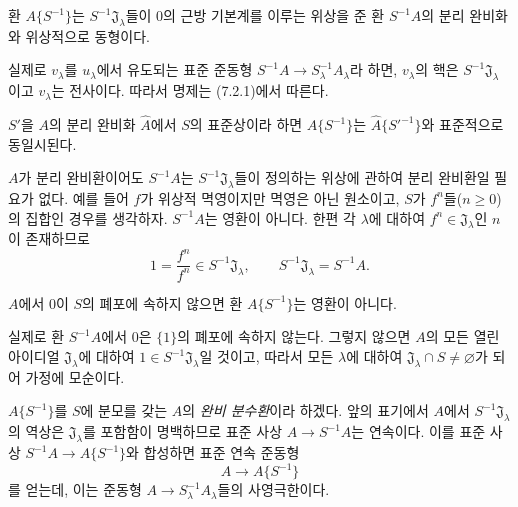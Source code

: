 \begin{proposition}[7.6.2]
\label{0.7.6.2-ko}
환 $A\{S^{-1}\}$는 $S^{-1}\mathfrak J_\lambda$들이 $0$의 근방
기본계를 이루는 위상을 준 환 $S^{-1}A$의 분리 완비화와 위상적으로
동형이다.
\end{proposition}

실제로 $v_\lambda$를 $u_\lambda$에서 유도되는 표준 준동형
$S^{-1}A\to S_\lambda^{-1}A_\lambda$라 하면, $v_\lambda$의 핵은
$S^{-1}\mathfrak J_\lambda$이고 $v_\lambda$는 전사이다. 따라서
명제는 (7.2.1)에서 따른다.

\begin{corollary}[7.6.3]
\label{0.7.6.3-ko}
$S'$을 $A$의 분리 완비화 $\widehat A$에서 $S$의 표준상이라 하면
$A\{S^{-1}\}$는 $\widehat A\{{S'}^{-1}\}$와 표준적으로
동일시된다.
\end{corollary}

$A$가 분리 완비환이어도 $S^{-1}A$는
$S^{-1}\mathfrak J_\lambda$들이 정의하는 위상에 관하여 분리
완비환일 필요가 없다. 예를 들어 $f$가 위상적 멱영이지만 멱영은 아닌
원소이고, $S$가 $f^n$들($n\geq0$)의 집합인 경우를 생각하자.
$S^{-1}A$는 영환이 아니다. 한편 각 $\lambda$에 대하여
$f^n\in\mathfrak J_\lambda$인 $n$이 존재하므로
\[
  1=\frac{f^n}{f^n}\in S^{-1}\mathfrak J_\lambda,
  \qquad S^{-1}\mathfrak J_\lambda=S^{-1}A.
\]


\begin{corollary}[7.6.4]
\label{0.7.6.4-ko}
$A$에서 $0$이 $S$의 폐포에 속하지 않으면 환 $A\{S^{-1}\}$는
영환이 아니다.
\end{corollary}

실제로 환 $S^{-1}A$에서 $0$은 $\{1\}$의 폐포에 속하지 않는다.
그렇지 않으면 $A$의 모든 열린 아이디얼 $\mathfrak J_\lambda$에
대하여 $1\in S^{-1}\mathfrak J_\lambda$일 것이고, 따라서 모든
$\lambda$에 대하여
$\mathfrak J_\lambda\cap S\neq\varnothing$가 되어 가정에 모순이다.

\begin{env}[7.6.5]
\label{0.7.6.5-ko}
$A\{S^{-1}\}$를 $S$에 분모를 갖는 $A$의 \emph{완비 분수환}이라
하겠다. 앞의 표기에서 $A$에서 $S^{-1}\mathfrak J_\lambda$의
역상은 $\mathfrak J_\lambda$를 포함함이 명백하므로 표준 사상
$A\to S^{-1}A$는 연속이다. 이를 표준 사상
$S^{-1}A\to A\{S^{-1}\}$와 합성하면 표준 연속 준동형
\[
  A\longrightarrow A\{S^{-1}\}
\]
를 얻는데, 이는 준동형 $A\to S_\lambda^{-1}A_\lambda$들의
사영극한이다.
\end{env}

